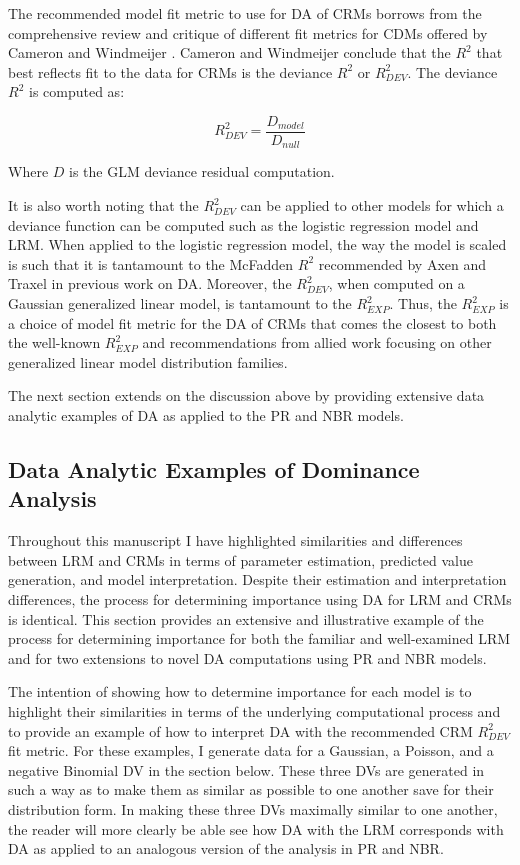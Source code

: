 \documentclass[ShortAfour,times,sageapa]{sagej}
\begin{document}
	The recommended model fit metric to use for DA of CRMs borrows from the comprehensive review and critique of different fit metrics for CDMs offered by Cameron and Windmeijer \cite{cameron1996r}.
	Cameron and Windmeijer conclude that the $R^2$ that best reflects fit to the data for CRMs is the deviance $R^2$ or $R^{2}_{DEV}$.
	The deviance $R^2$ is computed as:
	
	$$R^{2}_{DEV} = \frac{D_{model}}{D_{null}}$$
	
	Where $D$ is the GLM deviance residual computation.
	
	It is also worth noting that the $R^2_{DEV}$ can be applied to other models for which a deviance function can be computed such as the logistic regression model and LRM.  
	When applied to the logistic regression model, the way the model is scaled is such that it is tantamount to the McFadden $R^2$ recommended by Axen and Traxel \cite{azen2009using} in previous work on DA.
	Moreover, the $R^2_{DEV}$, when computed on a Gaussian generalized linear model, is tantamount to the $R^2_{EXP}$.
	Thus, the $R^2_{EXP}$ is a choice of model fit metric for the DA of CRMs that comes the closest to both the well-known $R^2_{EXP}$ and recommendations from allied work focusing on other generalized linear model distribution families.
	
	The next section extends on the discussion above by providing extensive data analytic examples of DA as applied to the PR and NBR models. 
	
	\subsection{Data Analytic Examples of Dominance Analysis}
	
	Throughout this manuscript I have highlighted similarities and differences between LRM and CRMs in terms of parameter estimation, predicted value generation, and model interpretation.
	Despite their estimation and interpretation differences, the process for determining importance using DA for LRM and CRMs is identical.
	This section provides an extensive and illustrative example of the process for determining importance for both the familiar and well-examined LRM and for two extensions to novel DA computations using PR and NBR models.
	
	The intention of showing how to determine importance for each model is to highlight their similarities in terms of the underlying computational process and to provide an example of how to interpret DA with the recommended CRM $R^2_{DEV}$ fit metric.
	For these examples, I generate data for a Gaussian, a Poisson, and a negative Binomial DV in the section below.
	These three DVs are generated in such a way as to make them as similar as possible to one another save for their distribution form.
	In making these three DVs maximally similar to one another, the reader will more clearly be able see how DA with the LRM corresponds with DA as applied to an analogous version of the analysis in PR and NBR.
	
\end{document}
